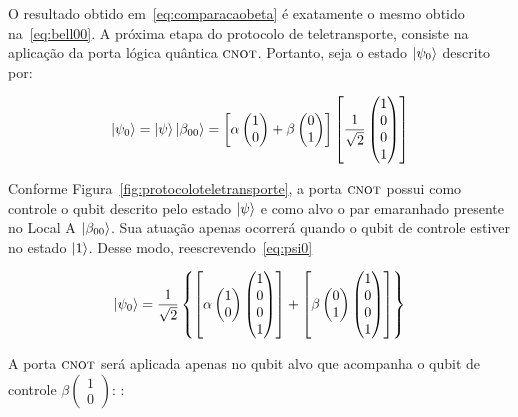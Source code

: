O resultado obtido em~\eqref{eq:comparacaobeta} é exatamente o mesmo obtido na~\eqref{eq:bell00}.
A próxima etapa do protocolo de teletransporte, consiste na aplicação da porta lógica quântica \(\operatorname{\textsc{cnot}}\). Portanto, seja o estado $\ket{\psi_0}$ descrito por:

\begin{equation}\label{eq:psi0}
\ket{\psi_0}=\ket{\psi}\ket{\beta_{00}}=\left[\alpha \begin{pmatrix}
1 \\
0 
\end{pmatrix} + \beta \begin{pmatrix}
0 \\
1
\end{pmatrix}\right] \left[\frac{1}{\sqrt{2}} \begin{pmatrix}
1 \\
0 \\
0 \\
1
\end{pmatrix}\right]
\end{equation}

Conforme Figura~\ref{fig:protocoloteletransporte}, a porta \(\operatorname{\textsc{cnot}}\) possui como controle o qubit descrito pelo estado $\ket{\psi}$ e como alvo o par emaranhado presente no Local A $\ket{\beta_{00}}$. Sua atuação apenas ocorrerá quando o qubit de controle estiver no estado $\ket{1}$. Desse modo, reescrevendo~\eqref{eq:psi0}

\begin{equation}
\ket{\psi_0} = \frac{1}{\sqrt{2}}\left\{\left[\alpha \begin{pmatrix}
1 \\
0 
\end{pmatrix}  \begin{pmatrix}
1 \\
0 \\
0 \\
1
\end{pmatrix}\right] + \left[\beta \begin{pmatrix}
0 \\
1
\end{pmatrix}  \begin{pmatrix}
1 \\
0 \\
0 \\
1
\end{pmatrix}\right] \right\}
\end{equation}

A porta \(\operatorname{\textsc{cnot}}\) será aplicada apenas no qubit alvo que acompanha o qubit de controle $\beta \begin{pmatrix}
1 \\
0 
\end{pmatrix}$:
:


